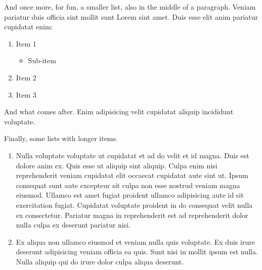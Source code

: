 \documentclass[
    12pt,
    letterpaper,
    oneside,
    noraggedright
]{turabian-researchpaper}
\makeatletter
\providecommand{\tightlist}{%
    \ifthenelse{\equal{\the\@listdepth}{1}}
    {}
    {\vspace{-\baselineskip}}
}
\makeatother
\begin{document}
And once more, for fun, a smaller list, also in the middle of a
paragraph. Veniam pariatur duis officia sint mollit sunt Lorem sint
amet. Duis esse elit anim pariatur cupidatat enim:

\begin{enumerate}
\def\labelenumi{\arabic{enumi}.}
\tightlist
\item
  Item 1

  \begin{itemize}
  \tightlist
  \item
    Sub-item
  \end{itemize}
\item
  Item 2
\item
  Item 3
\end{enumerate}

\noindent And what comes after. Enim adipisicing velit cupidatat aliquip
incididunt voluptate.

Finally, some lists with longer items.

\begin{enumerate}
\def\labelenumi{\arabic{enumi}.}
\tightlist
\item
  Nulla voluptate voluptate ut cupidatat et ad do velit et id magna.
  Duis est dolore anim ex. Quis esse ut aliquip sint aliquip. Culpa enim
  nisi reprehenderit veniam cupidatat elit occaecat cupidatat aute sint
  ut. Ipsum consequat sunt aute excepteur sit culpa non esse nostrud
  veniam magna eiusmod. Ullamco est amet fugiat proident ullamco
  adipisicing aute id sit exercitation fugiat. Cupidatat voluptate
  proident in do consequat velit nulla ex consectetur. Pariatur magna in
  reprehenderit est ad reprehenderit dolor nulla culpa ex deserunt
  pariatur nisi.
\item
  Ex aliqua non ullamco eiusmod et veniam nulla quis voluptate. Ex duis
  irure deserunt adipisicing veniam officia ea quis. Sunt nisi in mollit
  ipsum est nulla. Nulla aliquip qui do irure dolor culpa aliqua
  deserunt.
\end{enumerate}
\end{document}
